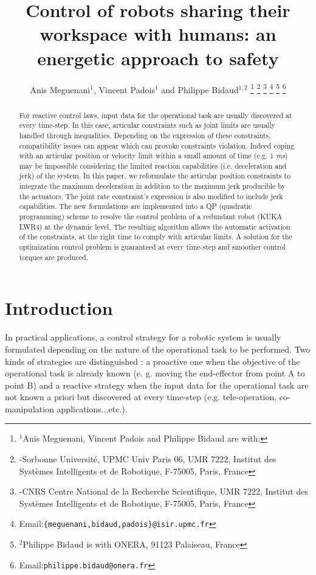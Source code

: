 \documentclass[a4paper, 10pt, conference]{ieeeconf}      %
\title{Control of robots sharing their workspace with humans: an energetic approach to safety}
\author{Anis Meguenani$^{1}$, Vincent Padois$^{1}$ and Philippe Bidaud$^{1,2}$ 
\thanks{$^{1}$Anis Meguenani, Vincent Padois and Philippe Bidaud are with:}
\thanks{-Sorbonne Universit\'{e}, UPMC Univ Paris 06, UMR 7222, Institut des Syst\`{e}mes Intelligents et de Robotique, F-75005, Paris, France}
\thanks{-CNRS Centre National de la Recherche Scientifique, UMR 7222, Institut des Syst\`{e}mes Intelligents et de Robotique, F-75005, Paris, France}
\thanks{Email:{\tt\small \{meguenani,bidaud,padois\}@isir.upmc.fr}}
\thanks{$^{2}$Philippe Bidaud is with ONERA, 91123 Palaiseau, France}
\thanks{Email:{\tt\small philippe.bidaud@onera.fr}}}
\begin{document}
\maketitle

\begin{abstract}
For reactive control laws, input data for the operational task are usually discovered at every time-step. In this case, articular constraints such as joint limits are usually handled through inequalities. Depending on the expression of these constraints, compatibility issues can appear which can provoke constraints violation. Indeed coping with an articular position or velocity limit within a small amount of time (e.g. 1 \textit{ms}) may be impossible considering the limited reaction capabilities (i.e. deceleration and jerk) of the system. In this paper, we reformulate the articular position constraints to integrate the maximum deceleration in addition to the maximum jerk producible by the actuators. The joint rate constraint's expression is also modified to include jerk capabilities. The new formulations are implemented into a QP (quadratic programming) scheme to resolve the control problem of a redundant robot (KUKA LWR4) at the dynamic level. The resulting algorithm allows the automatic activation of the constraints, at the right time to comply with articular limits. A solution for the optimization control problem is guaranteed at every time-step and smoother control torques are produced.
\end{abstract}



\IEEEpeerreviewmaketitle



\section{Introduction}
\label{sec:intro constrcomp}

In practical applications, a control strategy for a robotic system is usually formulated depending on the nature of the operational task to be performed. Two kinds of strategies are distinguished : a proactive one when the objective of the operational task is already known (e. g. moving the end-effector from point A to point B) and a reactive strategy when the input data for the operational task are not known a priori but discovered at every time-step (e.g. tele-operation, co-manipulation applications...etc.). 
\end{document}
